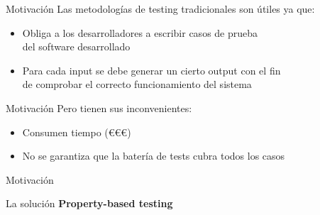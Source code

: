 \documentclass{beamer}
\begin{document}
    \begin{frame}{Motivación}
      Las metodologías de testing tradicionales son útiles ya que:
      \begin{itemize}
        \item Obliga a los desarrolladores a escribir casos de prueba\\
        del software desarrollado
        \item Para cada input se debe generar un cierto output con el fin\\
        de comprobar el correcto funcionamiento del sistema
      \end{itemize}
    \end{frame}

    \begin{frame}{Motivación}
      Pero tienen sus inconvenientes:
      \begin{itemize}
        \item Consumen tiempo (€€€)
        \item No se garantiza que la batería de tests cubra todos los casos
      \end{itemize}
    \end{frame}

    \begin{frame}{Motivación}
      \begin{exampleblock}{La solución}
        \textbf{Property-based testing}
      \end{exampleblock}
    \end{frame}
\end{document}
